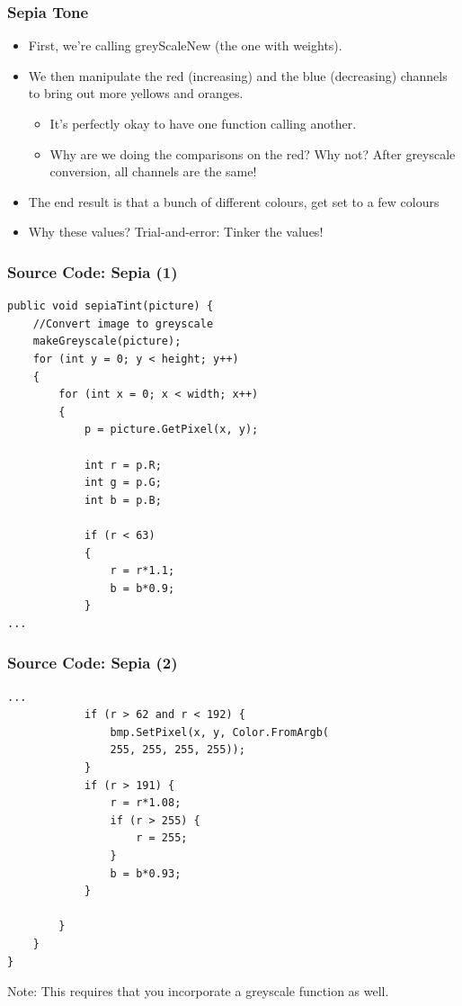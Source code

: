 \begin{frame}
	\frametitle{Sepia Tone}
	
	\begin{itemize}		
		\item First, we're calling greyScaleNew (the one with weights).
		\item We then manipulate the red (increasing) and the blue (decreasing) channels to bring out more yellows and oranges.
		\begin{itemize}
			\item It's perfectly okay to have one function calling another.
			\item Why are we doing the comparisons on the red? Why not?  After greyscale conversion, all channels are the same!
		\end{itemize}	
		\item The end result is that a bunch of different colours, get set to a few colours
		\item Why these values? Trial-and-error: Tinker the values!

	\end{itemize}
\end{frame}

\begin{frame}[fragile]
	\frametitle{Source Code: Sepia (1)}
	
\begin{lstlisting}
public void sepiaTint(picture) {
	//Convert image to greyscale
  	makeGreyscale(picture);  
	for (int y = 0; y < height; y++)
	{
		for (int x = 0; x < width; x++)
		{
			p = picture.GetPixel(x, y);
			
			int r = p.R;
			int g = p.G;
			int b = p.B;

			if (r < 63)
			{
				r = r*1.1;
				b = b*0.9;
			}			
...
\end{lstlisting}

\end{frame}

\begin{frame}[fragile]
	\frametitle{Source Code: Sepia (2)}
	
\begin{lstlisting}
...
			if (r > 62 and r < 192) {
				bmp.SetPixel(x, y, Color.FromArgb(
				255, 255, 255, 255));
			}
			if (r > 191) {
				r = r*1.08;
				if (r > 255) {
					r = 255; 	
				}
				b = b*0.93;
			}

		}
	}	
}

\end{lstlisting}
Note: This requires that you incorporate a greyscale function as well.

\end{frame}


